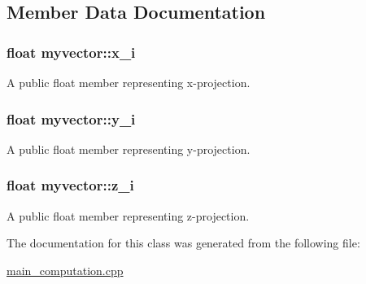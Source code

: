 \subsection{Member Data Documentation}
\subsubsection[{\texorpdfstring{x\+\_\+i}{x_i}}]{\setlength{\rightskip}{0pt plus 5cm}float myvector\+::x\+\_\+i}\hypertarget{classmyvector_ab893220476df8f4d0710871d02b76fe0}{}\label{classmyvector_ab893220476df8f4d0710871d02b76fe0}


A public float member representing x-\/projection. 

\subsubsection[{\texorpdfstring{y\+\_\+i}{y_i}}]{\setlength{\rightskip}{0pt plus 5cm}float myvector\+::y\+\_\+i}\hypertarget{classmyvector_ab61d4e74c6c20e28c93b23253c562889}{}\label{classmyvector_ab61d4e74c6c20e28c93b23253c562889}


A public float member representing y-\/projection. 

\subsubsection[{\texorpdfstring{z\+\_\+i}{z_i}}]{\setlength{\rightskip}{0pt plus 5cm}float myvector\+::z\+\_\+i}\hypertarget{classmyvector_a1dcafb966fd664d2b6c633cd90f05216}{}\label{classmyvector_a1dcafb966fd664d2b6c633cd90f05216}


A public float member representing z-\/projection. 



The documentation for this class was generated from the following file\+:\begin{DoxyCompactItemize}
\item 
\hyperlink{main__computation_8cpp}{main\+\_\+computation.\+cpp}\end{DoxyCompactItemize}
